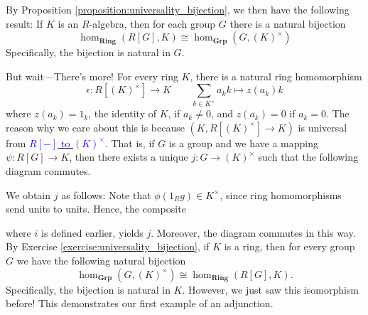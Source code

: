 \begin{example}
    By Proposition \ref{proposition:universality_bijection}, we then have the following result: 
    If $K$ is an $R$-algebra, then for each group $G$ there is a natural
    bijection
    \[
        \hom_{\textbf{Ring}}(R[G], K) \cong \hom_{\textbf{Grp}}(G, (K)^{\times})
    \]
    Specifically, the bijection is natural in $G$.

    But wait---There's more! For every ring $K$, there is a natural 
    ring homomorphism 
    \[
        \epsilon: R[(K)^{\times}] \to K \qquad \sum_{k \in K^{\times}}a_k k \mapsto z(a_k) k
    \]
    where $z(a_k) = 1_k$, the identity of $K$, if $a_k \ne 0$, and $z(a_k) = 0$ if $a_k = 0$. 
    The reason why we care about this is because $(K, R[(K)^{\times}] \to K)$
    is universal from \hyperref[definition:universal_morphism_from_F_to_D]{\textcolor{blue}{$R[-]$ to $(K)^{\times}$}}.
    That is, if $G$ is a group and we have a mapping $\psi: R[G] \to K$, 
    then there exists a unique $j: G \to (K)^{\times}$ such that the following diagram 
    commutes. 
    \begin{center}
        \hspace{1cm}
    \end{center}
    We obtain $j$ as follows: Note that $\phi(1_R g) \in K^{\times}$, since 
    ring homomorphisms send units to units. Hence, the composite 
    \begin{center}
    \end{center}
    where $i$ is defined earlier, yields $j$. Moreover, the diagram commutes in this way. 
    By Exercise \ref{exercise:universality_bijection}, if $K$ is a ring, then for every group $G$ 
    we have the following natural bijection 
    \[
        \hom_{\textbf{Grp}}(G, (K)^{\times})\cong \hom_{\textbf{Ring}}(R[G], K).
    \] 
    Specifically, the bijection is natural in $K$. However, we just saw this isomorphism before!
    This demonstrates our first example of an adjunction. 
\end{example}

